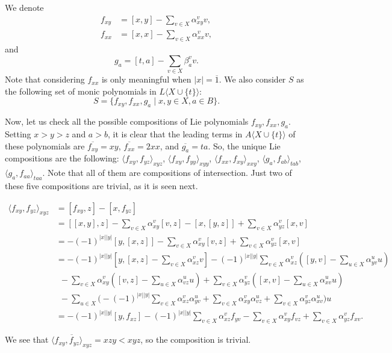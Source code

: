 \documentclass[reqno]{amsart}
\theoremstyle{definition}
\theoremstyle{remark}
\numberwithin{equation}{section}
\begin{document}
We denote
\begin{align*}
f_{xy}&=[x,y]-\sum_{v\in X}\alpha_{xy}^vv,\\
f_{xx}&=[x,x]-\sum_{v\in X}\alpha_{xx}^vv,
\end{align*}
 and
\[g_a=[t,a]-\sum_{v\in X}\beta_a^vv.\]
Note that considering $f_{xx}$ is only meaningful when $|x|=\overline{1}$. We also consider $S$ as the following set of monic polynomials in $L\langle X\cup\{t\}\rangle$:
\[S =\{ f_{xy}, f_{xx}, g_{a} \mid x,y \in X , a \in B \}. \]

Now, let us check all the possible compositions of Lie polynomials $f_{xy},f_{xx},g_a$. Setting $x > y > z$ and $a> b$, it is clear that the leading terms in $A\langle X\cup\{t\} \rangle$ of these polynomials are $\overline{f_{xy}}=xy$, $\overline{f_{xx}}=2xx$, and $\overline{g_a}=ta$. So, the unique Lie compositions are the following: $\langle f_{xy},f_{yz}\rangle_{xyz}$, $\langle f_{xy},f_{yy}\rangle_{xyy}$, $\langle f_{xx},f_{xy}\rangle_{xxy}$, $\langle g_a,f_{ab}\rangle_{tab}$, $\langle g_a,f_{aa}\rangle_{taa}$. Note that all of them are compositions of intersection.
Just two of these five compositions are trivial, as it is seen next.

\begin{align*}
\langle f_{xy},f_{yz}\rangle_{xyz}&=[f_{xy},z]-[x,f_{yz}] \\
& =[[x,y],z]-\sum_{v\in X}\alpha_{xy}^v[v,z]-[x,[y,z]]+\sum_{v\in X}\alpha_{yz}^v[x,v]\\
& =-(-1)^{|x||y|}[y,[x,z]]-\sum_{v\in X}\alpha_{xy}^v[v,z]+\sum_{v\in X}\alpha_{yz}^v[x,v]\\
&=-(-1)^{|x||y|}[y,[x,z]-\sum_{v\in X}\alpha_{xz}^vv]-(-1)^{|x||y|}\sum_{v\in X}\alpha_{xz}^v([y,v]-\sum_{u\in X}\alpha_{yv}^{u}u)\\
& \ \ -\sum_{v\in X}\alpha_{xy}^v([v,z]-\sum_{u\in X}\alpha_{vz}^uu)+\sum_{v\in X}\alpha_{yz}^v([x,v]-\sum_{u\in X}\alpha_{xv}^uu)\\
& \ \ -\sum_{u\in X}\Big(-(-1)^{|x||y|}\sum_{v\in X}\alpha_{xz}^v\alpha_{yv}^{u}+\sum_{v\in X}\alpha_{xy}^v\alpha_{vz}^u+\sum_{v\in X}\alpha_{yz}^v\alpha_{xv}^u\Big)u\\
&=-(-1)^{|x||y|}[y,f_{xz}]-(-1)^{|x||y|}\sum_{v\in X}\alpha_{xz}^vf_{yv}-\sum_{v\in X}\alpha_{xy}^vf_{vz}+\sum_{v\in X}\alpha_{yz}^vf_{xv}.
\end{align*}

We see that $\overline{\langle f_{xy},f_{yz}\rangle_{xyz}}=xzy<xyz$, so the composition is trivial.
\end{document}
